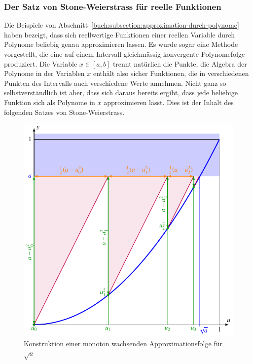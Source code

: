 \subsubsection{Der Satz von Stone-Weierstrass für reelle Funktionen}
%
%
Die Beispiele von Abschnitt~\ref{buch:subsection:approximation-durch-polynome}
haben bezeigt, dass sich reellwertige Funktionen einer reellen
Variable durch Polynome beliebig genau approximieren lassen.
Es wurde sogar eine Methode vorgestellt, die eine auf einem Intervall
gleichmässig konvergente Polynomefolge produziert.
Die Variable $x\in[a,b]$ trennt natürlich die Punkte, die Algebra der
Polynome in der Variablen $x$ enthält also sicher Funktionen, die in
verschiedenen Punkten des Intervalls auch verschiedene Werte annehmen.
Nicht ganz so selbstverständlich ist aber, dass sich daraus bereits
ergibt, dass jede beliebige Funktion sich als Polynome in $x$
approximieren lässt.
Dies ist der Inhalt des folgenden Satzes von Stone-Weierstrass.

\begin{figure}
\centering
\includegraphics{chapters/40-eigenwerte/images/wurzel.pdf}
\caption{Konstruktion einer monoton wachsenden Approximationsfolge für
$\sqrt{a}$
\label{buch:eigenwerte:fig:wurzelverfahren}}
\end{figure}

